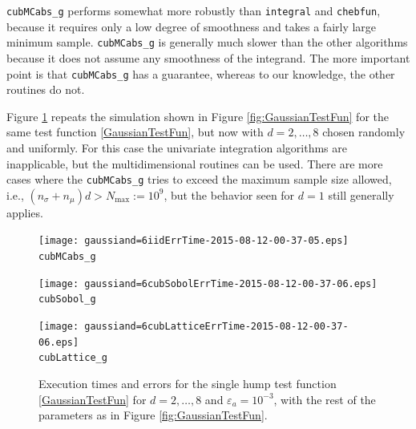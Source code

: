 \documentclass{iitthesis}
\begin{document}
 {\tt cubMCabs\_g}  performs somewhat more robustly than {\tt integral} and {\tt chebfun}, because it requires only a low degree of smoothness and takes a fairly large minimum sample.  {\tt cubMCabs\_g} is generally much slower than the other algorithms because it does not assume any smoothness of the integrand. The more important point is that  {\tt cubMCabs\_g}  has a guarantee, whereas to our knowledge, the other routines do not.
%
%

Figure \ref{fig:GaussianTestFunHD} repeats the simulation shown in Figure \ref{fig:GaussianTestFun} for the same test function \eqref{GaussianTestFun}, but now with $d=2, \ldots, 8$ chosen randomly and uniformly.  For this case the univariate integration algorithms are inapplicable, but the multidimensional routines can be used.  There are more cases where the {\tt cubMCabs\_g} tries to exceed the maximum sample size allowed, i.e., $(n_{\sigma}+n_\mu)d > N_{\max}:=10^9$, but the behavior seen for $d=1$ still generally applies.  

\begin{figure}
\centering
\begin{minipage}{9cm} \centering \texttt{[image: gaussiand=6iidErrTime-2015-08-12-00-37-05.eps]} \\ {\tt cubMCabs\_g} \end{minipage}
\begin{minipage}{7cm} \centering \texttt{[image: gaussiand=6cubSobolErrTime-2015-08-12-00-37-06.eps]} \\ {\tt cubSobol\_g} \end{minipage}
\begin{minipage}{7cm} \centering \texttt{[image: gaussiand=6cubLatticeErrTime-2015-08-12-00-37-06.eps]} \\ {\tt cubLattice\_g} \end{minipage}
\caption{Execution times and errors for the single hump test function \eqref{GaussianTestFun} for $d=2, \ldots, 8$ and $\varepsilon_a=10^{-3}$, with the rest of the parameters as in Figure \ref{fig:GaussianTestFun}.\label{fig:GaussianTestFunHD}}
\end{figure}
\end{document}
